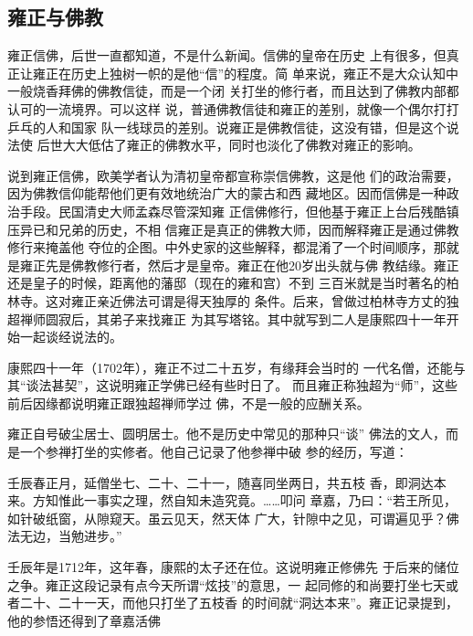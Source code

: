 \subsection{雍正与佛教}
\par
雍正信佛，后世一直都知道，不是什么新闻。信佛的皇帝在历史%
上有很多，但真正让雍正在历史上独树一帜的是他“信”的程度。简%
单来说，雍正不是大众认知中一般烧香拜佛的佛教信徒，而是一个闭%
关打坐的修行者，而且达到了佛教内部都认可的一流境界。可以这样%
说，普通佛教信徒和雍正的差别，就像一个偶尔打打乒乓的人和国家%
队一线球员的差别。说雍正是佛教信徒，这没有错，但是这个说法使%
后世大大低估了雍正的佛教水平，同时也淡化了佛教对雍正的影响。%
\par
说到雍正信佛，欧美学者认为清初皇帝都宣称崇信佛教，这是他%
们的政治需要，因为佛教信仰能帮他们更有效地统治广大的蒙古和西%
藏地区。因而信佛是一种政治手段。民国清史大师孟森尽管深知雍%
正信佛修行，但他基于雍正上台后残酷镇压异已和兄弟的历史，不相%
信雍正是真正的佛教大师，因而解释雍正是通过佛教修行来掩盖他%
夺位的企图。中外史家的这些解释，都混淆了一个时间顺序，那就%
是雍正先是佛教修行者，然后才是皇帝。雍正在他20岁出头就与佛%
教结缘。雍正还是皇子的时候，距离他的藩邸（现在的雍和宫）不到%
三百米就是当时著名的柏林寺。这对雍正亲近佛法可谓是得天独厚的%
条件。后来，曾做过柏林寺方丈的独超禅师圆寂后，其弟子来找雍正%
为其写塔铭。其中就写到二人是康熙四十一年开始一起谈经说法的。%
\par
康熙四十一年（1702年），雍正不过二十五岁，有缘拜会当时的%
一代名僧，还能与其“谈法甚契”，这说明雍正学佛已经有些时日了。%
而且雍正称独超为“师”，这些前后因缘都说明雍正跟独超禅师学过%
佛，不是一般的应酬关系。%
\par
雍正自号破尘居士、圆明居士。他不是历史中常见的那种只“谈”%
佛法的文人，而是一个参禅打坐的实修者。他自己记录了他参禅中破%
参的经历，写道：%
\par
{\bookkai 壬辰春正月，延僧坐七、二十、二十一，随喜同坐两日，共五枝}%
{\bookkai 香，即洞达本来。方知惟此一事实之理，然自知未造究竟。……叩问}%
{\bookkai 章嘉，乃曰：“若王所见，如针破纸窗，从隙窥天。虽云见天，然天体}%
{\bookkai 广大，针隙中之见，可谓遍见乎？佛法无边，当勉进步。”}%
\par
壬辰年是1712年，这年春，康熙的太子还在位。这说明雍正修佛先%
于后来的储位之争。雍正这段记录有点今天所谓“炫技”的意思，一%
起同修的和尚要打坐七天或者二十、二十一天，而他只打坐了五枝香%
的时间就“洞达本来”。雍正记录提到，他的参悟还得到了章嘉活佛%

